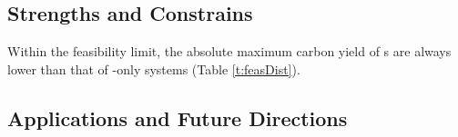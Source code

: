 \documentclass[../thesis.tex]{subfiles} %
\begin{document}
\subsection{Strengths and Constrains}
Within the feasibility limit, the absolute maximum carbon yield of \pbs s are always lower than that of \phy-only systems (Table \ref{t:feasDist}).  


\subsection{Applications and Future Directions}
\end{document}
